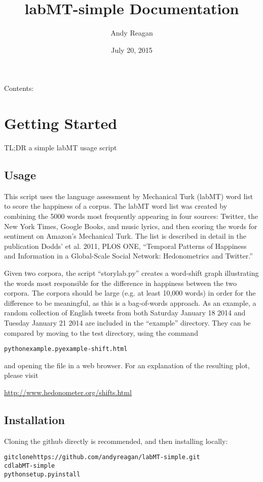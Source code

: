 \documentclass[letterpaper,10pt,english]{sphinxmanual}
\title{labMT-simple Documentation}
\date{July 20, 2015}
\author{Andy Reagan}
\begin{document}
\maketitle
\tableofcontents
{}\label{index::doc}


Contents:


\chapter{Getting Started}
\label{getting-started:welcome-to-labmt-simple-s-documentation}\label{getting-started:getting-started}\label{getting-started::doc}
TL;DR
a simple labMT usage script


\section{Usage}
\label{getting-started:usage}
This script uses the language assessment by Mechanical Turk (labMT) word list to score the happiness of a corpus. The labMT word list was created by combining the 5000 words most frequently appearing in four sources: Twitter, the New York Times, Google Books, and music lyrics, and then scoring the words for sentiment on Amazon's Mechanical Turk. The list is described in detail in the publication Dodds' et al. 2011, PLOS ONE, ``Temporal Patterns of Happiness and Information in a Global-Scale Social Network: Hedonometrics and Twitter.''

Given two corpora, the script ``storylab.py'' creates a word-shift graph illustrating the words most responsible for the difference in happiness between the two corpora. The corpora should be large (e.g. at least 10,000 words) in order for the difference to be meaningful, as this is a bag-of-words approach. As an example, a random collection of English tweets from both Saturday January 18 2014 and Tuesday January 21 2014 are included in the ``example'' directory. They can be compared by moving to the test directory, using the command
\begin{alltt}
python example.py example-shift.html
\end{alltt}

and opening the file  in a web browser. For an explanation of the resulting plot, please visit

\href{http://www.hedonometer.org/shifts.html}{http://www.hedonometer.org/shifts.html}


\section{Installation}
\label{getting-started:installation}
Cloning the github directly is recommended, and then installing locally:
\begin{alltt}
git clone https://github.com/andyreagan/labMT-simple.git
cd labMT-simple
python setup.py install
\end{alltt}
\end{document}
